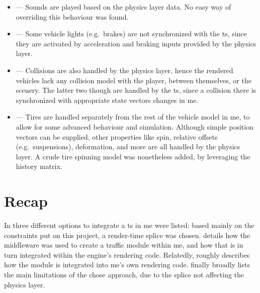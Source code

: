 \begin{itemize}
	\item {} --- Sounds are played based on the physics layer data. No easy way of overriding this behaviour was found.
	\item {} --- Some vehicle lights (e.g.\ brakes) are not synchronized with the \gls{ts}, since they are activated by acceleration and braking inputs provided by the physics layer.
	\item {} --- Collisions are also handled by the physics layer, hence the rendered vehicles lack any collision model with the player, between themselves, or the scenery. The latter two though are handled by the \gls{ts}, since a collision there is synchronized with appropriate state vectors changes in \gls{me}.
	\item {} --- Tires are handled separately from the rest of the vehicle model in \gls{me}, to allow for some advanced behaviour and simulation. Although simple position vectors can be supplied, other properties like spin, relative offsets (e.g.\ suspensions), deformation, and more are all handled by the physics layer. A crude tire spinning model was nonetheless added, by leveraging the history matrix.
\end{itemize}

\section{Recap}\label{sc:integration:recap}

In  three different options to integrate a \gls{ts} in \gls{me} were listed: based mainly on the constraints put on this project, a render-time splice was chosen.  details how the \gls{middleware} was used to create a traffic module within \gls{me}, and how that is in turn integrated within the engine's rendering code. Relatedly,  roughly describes how the module is integrated into \gls{me}'s own rendering code.  finally broadly lists the main limitations of the chose approach, due to the splice not affecting the physics layer.
